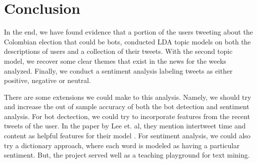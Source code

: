 \documentclass[10pt,a4paper]{article} %
\begin{document}
		
	\section{Conclusion}
		
	In the end, we have found evidence that a portion of the users tweeting about the Colombian election that could be bots, conducted LDA topic models on both the descriptions of users and a collection of their tweets.  With the second topic model, we recover some clear themes that exist in the news for the weeks analyzed.  Finally, we conduct a sentiment analysis labeling tweets as either positive, negative or neutral.
	
	There are some extensions we could make to this analysis.  Namely, we should try and increase the out of sample accuracy of both the bot detection and sentiment analysis.  For bot dectection, we could try to incorporate features from the recent tweets of the user.  In the paper by Lee et. al, they mention intertweet time and content as helpful features for their model \cite{Lee2011SevenMW}.  For sentiment analysis, we could also try a dictionary approach, where each word is modeled as having a particular sentiment.  But, the project served well as a teaching playground for text mining.
	
	\nocite{*}
	
	
\end{document}
